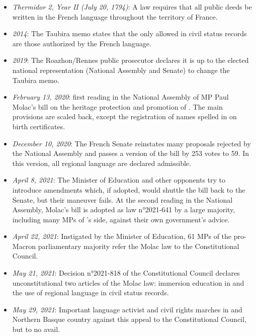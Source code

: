 \documentclass[output=paper,colorlinks,citecolor=brown]{langscibook}
\begin{document}


\begin{itemize}
\item {\textit{Thermidor 2, Year II (July 20, 1794)}: A law requires that all public deeds be written in the French language throughout the territory of France.}
\item {\textit{2014}: The Taubira memo states that the only  allowed in civil status records are those authorized by the French language.}
\item {\textit{2019}: The Roazhon/Rennes public prosecutor declares it is up to the elected national representation (National Assembly and Senate) to change the Tau\-bira memo.}
\item {\textit{February 13, 2020}: first reading in the National Assembly of MP Paul Mo\-lac’s bill on the heritage protection and promotion of . The main provisions are scaled back, except the registration of names spell\-ed in  on birth certificates.} 
\item {\textit{December 10, 2020}: The French Senate reinstates many proposals rejected by the National Assembly and passes a version of the bill by 253 votes to 59. In this version, all regional language  are declared admissible.}
\item {\textit{April 8, 2021}: The Minister of Education and other opponents try to introduce amendments which, if adopted, would shuttle the bill back to the Senate, but their maneuver fails. At the second reading in the National Assembly, Molac's bill is adopted as law n°2021-641 by a large majority, including many MPs of ’s side, against their own government’s advice.}
\item {\textit{April 22, 2021}: Instigated by the Minister of Education, 61 MPs of the pro-Macron parliamentary majority refer the Molac law to the Constitutional Council.} 
\item {\textit{May 21, 2021}: Decision n°2021-818 of the Constitutional Council declares unconstitutional two articles of the Molac law: immersion education in  and the use of regional language  in civil status records.}
\item {\textit{May 29, 2021}: Important language activist and civil rights marches in  and Northern Basque country against this appeal to the Constitutional Council, but to no avail.}
\end{itemize}




\sloppy
\printbibliography[heading=subbibliography,notkeyword=this]
\end{document}
